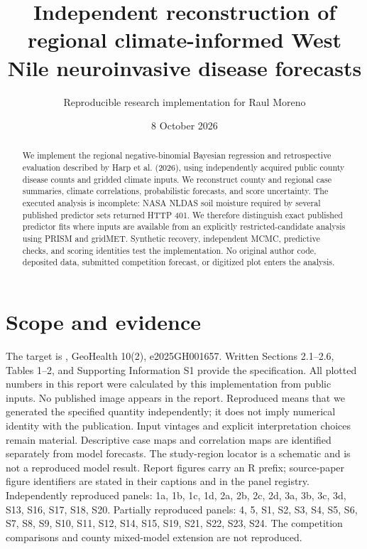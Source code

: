 \documentclass[11pt]{article}
\title{Independent reconstruction of regional climate-informed West Nile neuroinvasive disease forecasts}
\author{Reproducible research implementation for Raul Moreno}
\date{8 October 2026}
\begin{document}
\maketitle
\begin{abstract}
We implement the regional negative-binomial Bayesian regression and retrospective
evaluation described by Harp et al. (2026), using independently acquired public
county disease counts and gridded climate inputs. We reconstruct county and regional
case summaries, climate correlations, probabilistic forecasts, and score uncertainty.
The executed analysis is incomplete: NASA NLDAS soil moisture required by several
published predictor sets returned HTTP 401. We therefore distinguish exact published
predictor fits where inputs are available from an explicitly restricted-candidate
analysis using PRISM and gridMET. Synthetic recovery, independent MCMC, predictive
checks, and scoring identities test the implementation. No original author code,
deposited data, submitted competition forecast, or digitized plot enters the analysis.
\end{abstract}
\section{Scope and evidence}
The target is \citet{harp}, GeoHealth 10(2), e2025GH001657. Written Sections 2.1--2.6,
Tables 1--2, and Supporting Information S1 provide the specification. All plotted
numbers in this report were calculated by this implementation from public inputs.
No published image appears in the report. Reproduced means that we generated the
specified quantity independently; it does not imply numerical identity with the
publication. Input vintages and explicit interpretation choices remain material.
Descriptive case maps and correlation maps are identified separately from model
forecasts. The study-region locator is a schematic and is not a reproduced model result.
Report figures carry an R prefix; source-paper figure identifiers are stated in
their captions and in the panel registry.
Independently reproduced panels: 1a, 1b, 1c, 1d, 2a, 2b, 2c, 2d, 3a, 3b, 3c, 3d, S13, S16, S17, S18, S20. Partially reproduced panels: 4, 5, S1, S2, S3, S4, S5, S6, S7, S8, S9, S10, S11, S12, S14, S15, S19, S21, S22, S23, S24. The competition comparisons and county mixed-model extension are not reproduced.
\end{document}
